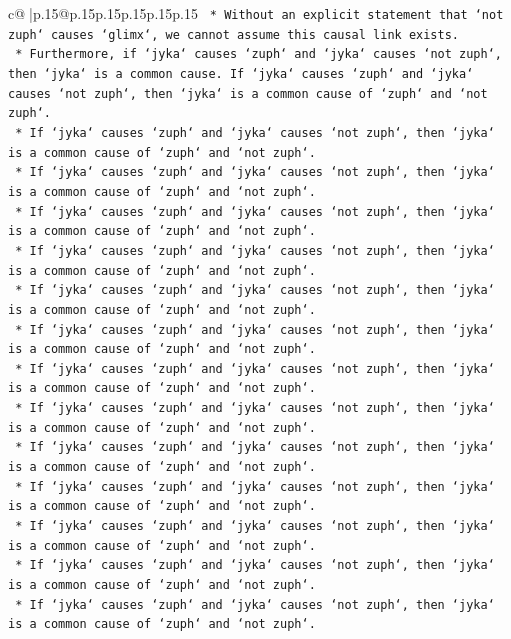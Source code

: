 \documentclass{article}
\begin{document}
{\begin{supertabular}{c@{$\;$}|p{.15\linewidth}@{}p{.15\linewidth}p{.15\linewidth}p{.15\linewidth}p{.15\linewidth}p{.15\linewidth}}
{{{\texttt{    *   Without an explicit statement that `not zuph` causes `glimx`, we cannot assume this causal link exists.} \\
\texttt{    *   Furthermore, if `jyka` causes `zuph` and `jyka` causes `not zuph`, then `jyka` is a common cause. If `jyka` causes `zuph` and `jyka` causes `not zuph`, then `jyka` is a common cause of `zuph` and `not zuph`.} \\
\texttt{    *   If `jyka` causes `zuph` and `jyka` causes `not zuph`, then `jyka` is a common cause of `zuph` and `not zuph`.} \\
\texttt{    *   If `jyka` causes `zuph` and `jyka` causes `not zuph`, then `jyka` is a common cause of `zuph` and `not zuph`.} \\
\texttt{    *   If `jyka` causes `zuph` and `jyka` causes `not zuph`, then `jyka` is a common cause of `zuph` and `not zuph`.} \\
\texttt{    *   If `jyka` causes `zuph` and `jyka` causes `not zuph`, then `jyka` is a common cause of `zuph` and `not zuph`.} \\
\texttt{    *   If `jyka` causes `zuph` and `jyka` causes `not zuph`, then `jyka` is a common cause of `zuph` and `not zuph`.} \\
\texttt{    *   If `jyka` causes `zuph` and `jyka` causes `not zuph`, then `jyka` is a common cause of `zuph` and `not zuph`.} \\
\texttt{    *   If `jyka` causes `zuph` and `jyka` causes `not zuph`, then `jyka` is a common cause of `zuph` and `not zuph`.} \\
\texttt{    *   If `jyka` causes `zuph` and `jyka` causes `not zuph`, then `jyka` is a common cause of `zuph` and `not zuph`.} \\
\texttt{    *   If `jyka` causes `zuph` and `jyka` causes `not zuph`, then `jyka` is a common cause of `zuph` and `not zuph`.} \\
\texttt{    *   If `jyka` causes `zuph` and `jyka` causes `not zuph`, then `jyka` is a common cause of `zuph` and `not zuph`.} \\
\texttt{    *   If `jyka` causes `zuph` and `jyka` causes `not zuph`, then `jyka` is a common cause of `zuph` and `not zuph`.} \\
\texttt{    *   If `jyka` causes `zuph` and `jyka` causes `not zuph`, then `jyka` is a common cause of `zuph` and `not zuph`.} \\
\texttt{    *   If `jyka` causes `zuph` and `jyka` causes `not zuph`, then `jyka` is a common cause of `zuph` and `not zuph`.} \\
}}}
\end{supertabular}}
\end{document}
